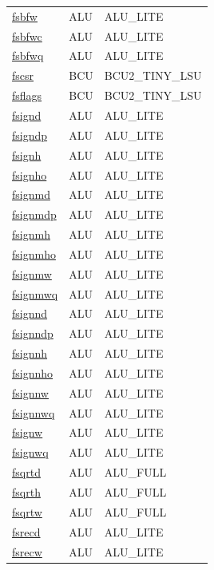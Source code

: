 \begin{small}
\begin{longtable}[l]{l l l}
\hyperlink{lvx.fsbfw}{fsbfw} & ALU & ALU\_LITE \\ 
\hyperlink{lvx.fsbfwc}{fsbfwc} & ALU & ALU\_LITE \\ 
\hyperlink{lvx.fsbfwq}{fsbfwq} & ALU & ALU\_LITE \\ 
\hyperlink{lvx.fscsr}{fscsr} & BCU & BCU2\_TINY\_LSU \\ 
\hyperlink{lvx.fsflags}{fsflags} & BCU & BCU2\_TINY\_LSU \\ 
\hyperlink{lvx.fsignd}{fsignd} & ALU & ALU\_LITE \\ 
\hyperlink{lvx.fsigndp}{fsigndp} & ALU & ALU\_LITE \\ 
\hyperlink{lvx.fsignh}{fsignh} & ALU & ALU\_LITE \\ 
\hyperlink{lvx.fsignho}{fsignho} & ALU & ALU\_LITE \\ 
\hyperlink{lvx.fsignmd}{fsignmd} & ALU & ALU\_LITE \\ 
\hyperlink{lvx.fsignmdp}{fsignmdp} & ALU & ALU\_LITE \\ 
\hyperlink{lvx.fsignmh}{fsignmh} & ALU & ALU\_LITE \\ 
\hyperlink{lvx.fsignmho}{fsignmho} & ALU & ALU\_LITE \\ 
\hyperlink{lvx.fsignmw}{fsignmw} & ALU & ALU\_LITE \\ 
\hyperlink{lvx.fsignmwq}{fsignmwq} & ALU & ALU\_LITE \\ 
\hyperlink{lvx.fsignnd}{fsignnd} & ALU & ALU\_LITE \\ 
\hyperlink{lvx.fsignndp}{fsignndp} & ALU & ALU\_LITE \\ 
\hyperlink{lvx.fsignnh}{fsignnh} & ALU & ALU\_LITE \\ 
\hyperlink{lvx.fsignnho}{fsignnho} & ALU & ALU\_LITE \\ 
\hyperlink{lvx.fsignnw}{fsignnw} & ALU & ALU\_LITE \\ 
\hyperlink{lvx.fsignnwq}{fsignnwq} & ALU & ALU\_LITE \\ 
\hyperlink{lvx.fsignw}{fsignw} & ALU & ALU\_LITE \\ 
\hyperlink{lvx.fsignwq}{fsignwq} & ALU & ALU\_LITE \\ 
\hyperlink{lvx.fsqrtd}{fsqrtd} & ALU & ALU\_FULL \\ 
\hyperlink{lvx.fsqrth}{fsqrth} & ALU & ALU\_FULL \\ 
\hyperlink{lvx.fsqrtw}{fsqrtw} & ALU & ALU\_FULL \\ 
\hyperlink{lvx.fsrecd}{fsrecd} & ALU & ALU\_LITE \\ 
\hyperlink{lvx.fsrecw}{fsrecw} & ALU & ALU\_LITE \\ 

\end{longtable}
\end{small}
